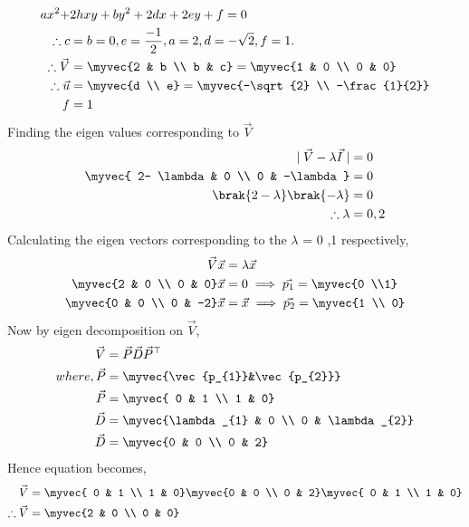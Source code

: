 \begin{align}
    ax^2+&2hxy+by^2+2dx+2ey+f=0\\
    \therefore c&=b=0,e=\frac{-1}{2}, a=2,d=-\sqrt{2},f=1.\\
    \therefore \vec{V}&=\myvec{2 & b \\ b & c}=\myvec{1 & 0 \\ 0 & 0}\\ \therefore \vec{u}&=\myvec{d \\ e}= \myvec{-\sqrt{2} \\ -\frac{1}{2}}\\ f&=1
\end{align}
Finding the eigen values corresponding to  $\vec{V}$
\begin{align}
    \mid \vec{V}- \lambda \vec{I} \mid &=0\\
    \myvec{ 2- \lambda & 0 \\ 0 & -\lambda}&=0\\
    \brak{2 - \lambda}\brak{-\lambda}&=0 \\
    \therefore \lambda &= 0 ,2
\end{align}
Calculating the eigen vectors corresponding to the $\lambda$ = 0 ,1 respectively,
\begin{align}
    \vec{V}\vec{x}&=\lambda\vec{x}\\
    \myvec{2 & 0 \\ 0 & 0}\vec{x}&=0 \implies \vec{p_{1}}=\myvec{0 \\1}\\
    \myvec{0 & 0 \\ 0 & -2}\vec{x} &= \vec{x} \implies \vec{p_{2}}= \myvec{1 \\ 0} 
\end{align}
Now by eigen decomposition on $\vec{V}$,
\begin{align}
    \vec{V}&= \vec{P}\vec{D}\vec{P}^{\top}\\
    where,\vec{P}&= \myvec{\vec{p_{1}}&\vec{p_{2}}}\\
    \vec{P}&=\myvec{ 0 & 1 \\ 1 & 0}\\
    \vec{D}&= \myvec{\lambda_{1} & 0 \\ 0 & \lambda_{2}}\\
    \vec{D}&= \myvec{0 & 0 \\ 0 & 2}
\end{align}
Hence equation becomes,
\begin{align}
    \vec{V}&= \myvec{ 0 & 1 \\ 1 & 0}\myvec{0 & 0 \\ 0 & 2}\myvec{ 0 & 1 \\ 1 & 0}\\
    \therefore \vec{V}&=\myvec{2 & 0 \\ 0 & 0}
\end{align}
